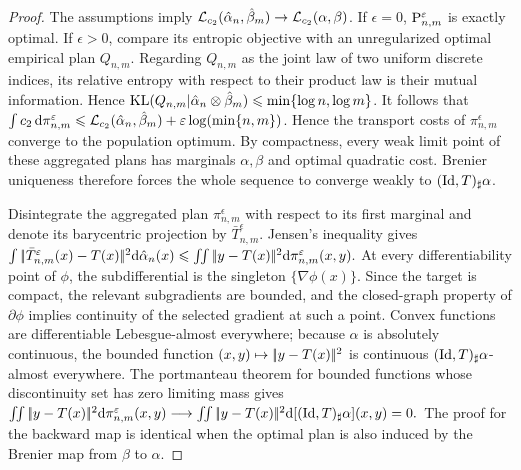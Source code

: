 \begin{proof}
The assumptions imply \(\MK_{c_2}(\hat\alpha_n,\hat\beta_m)\to\MK_{c_2}(\alpha,\beta)\). If \(\epsilon=0\), \(\P_{n,m}^{\epsilon}\) is exactly optimal. If \(\epsilon>0\), compare its entropic objective with an unregularized optimal empirical plan \(Q_{n,m}\). Regarding \(Q_{n,m}\) as the joint law of two uniform discrete indices, its relative entropy with respect to their product law is their mutual information. Hence
$\KLD(Q_{n,m}|\hat\alpha_n\otimes\hat\beta_m) \leq \min\{\log n,\log m\}$.
It follows that
$\int c_2\,\d \pi_{n,m}^{\epsilon} \leq \MK_{c_2}(\hat\alpha_n,\hat\beta_m) +\epsilon\log(\min\{n,m\})$.
Hence the transport costs of \(\pi_{n,m}^{\epsilon}\) converge to the population optimum. By compactness, every weak limit point of these aggregated plans has marginals \(\alpha,\beta\) and optimal quadratic cost. Brenier uniqueness therefore forces the whole sequence to converge weakly to \((\Id,T)_\sharp\alpha\).

Disintegrate the aggregated plan \(\pi_{n,m}^{\epsilon}\) with respect to its first marginal and denote its barycentric projection by \(\bar T_{n,m}^{\epsilon}\). Jensen's inequality gives
\(\int \norm{\bar T_{n,m}^{\epsilon}(x)-T(x)}^2\d\hat\alpha_n(x) \leq \iint \norm{y-T(x)}^2\d \pi_{n,m}^{\epsilon}(x,y).\)
At every differentiability point of \(\phi\), the subdifferential is the singleton \(\{\nabla\phi(x)\}\). Since the target is compact, the relevant subgradients are bounded, and the closed-graph property of \(\partial\phi\) implies continuity of the selected gradient at such a point. Convex functions are differentiable Lebesgue-almost everywhere; because \(\alpha\) is absolutely continuous, the bounded function \((x,y)\mapsto\norm{y-T(x)}^2\) is continuous \((\Id,T)_\sharp\alpha\)-almost everywhere. The portmanteau theorem for bounded functions whose discontinuity set has zero limiting mass gives
\(\iint \norm{y-T(x)}^2\d \pi_{n,m}^{\epsilon}(x,y) \longrightarrow \iint \norm{y-T(x)}^2\d[(\Id,T)_\sharp\alpha](x,y)=0.\)
The proof for the backward map is identical when the optimal plan is also induced by the Brenier map from \(\beta\) to \(\alpha\).
\end{proof}
